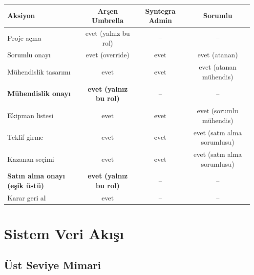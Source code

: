 \documentclass[11pt,a4paper]{article}
\begin{document}
\begin{tabularx}{\textwidth}{Xccc}
\toprule
\textbf{Aksiyon} & \textbf{Arşen Umbrella} & \textbf{Syntegra Admin} & \textbf{Sorumlu} \\
\midrule
Proje açma & evet (yalnız bu rol) & -- & -- \\
Sorumlu onayı & evet (override) & evet & evet (atanan) \\
Mühendislik tasarımı & evet & evet & evet (atanan mühendis) \\
\textbf{Mühendislik onayı} & \textbf{evet (yalnız bu rol)} & -- & -- \\
Ekipman listesi & evet & evet & evet (sorumlu mühendis) \\
Teklif girme & evet & evet & evet (satın alma sorumlusu) \\
Kazanan seçimi & evet & evet & evet (satın alma sorumlusu) \\
\textbf{Satın alma onayı (eşik üstü)} & \textbf{evet (yalnız bu rol)} & -- & -- \\
Karar geri al & evet & -- & -- \\
\bottomrule
\end{tabularx}

\newpage

\section{Sistem Veri Akışı}

\subsection{Üst Seviye Mimari}

\begin{center}
\end{center}
\end{document}
